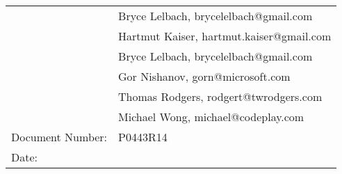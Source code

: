 \documentclass[a4paper,12pt,notitlepage,twoside,openright]{article}
\begin{document}
\begin{longtable}[]{@{}ll@{}}
\begin{minipage}[t]{0.26\columnwidth}
\strut
\end{minipage} & \begin{minipage}[t]{0.50\columnwidth}\raggedright
Bryce Lelbach, brycelelbach@gmail.com\strut
\end{minipage}\tabularnewline
\begin{minipage}[t]{0.26\columnwidth}\raggedright
\strut
\end{minipage} & \begin{minipage}[t]{0.50\columnwidth}\raggedright
Hartmut Kaiser, hartmut.kaiser@gmail.com\strut
\end{minipage}\tabularnewline
\begin{minipage}[t]{0.26\columnwidth}\raggedright
\strut
\end{minipage} & \begin{minipage}[t]{0.50\columnwidth}\raggedright
Bryce Lelbach, brycelelbach@gmail.com\strut
\end{minipage}\tabularnewline
\begin{minipage}[t]{0.26\columnwidth}\raggedright
\strut
\end{minipage} & \begin{minipage}[t]{0.50\columnwidth}\raggedright
Gor Nishanov, gorn@microsoft.com\strut
\end{minipage}\tabularnewline
\begin{minipage}[t]{0.26\columnwidth}\raggedright
\strut
\end{minipage} & \begin{minipage}[t]{0.50\columnwidth}\raggedright
Thomas Rodgers, rodgert@twrodgers.com\strut
\end{minipage}\tabularnewline
\begin{minipage}[t]{0.26\columnwidth}\raggedright
\strut
\end{minipage} & \begin{minipage}[t]{0.50\columnwidth}\raggedright
Michael Wong, michael@codeplay.com\strut
\end{minipage}\tabularnewline
\begin{minipage}[t]{0.26\columnwidth}\raggedright
Document Number:\strut
\end{minipage} & \begin{minipage}[t]{0.50\columnwidth}\raggedright
P0443R14\strut
\end{minipage}\tabularnewline
\begin{minipage}[t]{0.26\columnwidth}\raggedright
Date:\strut
\end{minipage} & \begin{minipage}[t]{0.50\columnwidth}\raggedright

\end{minipage}
\end{longtable}
\end{document}
